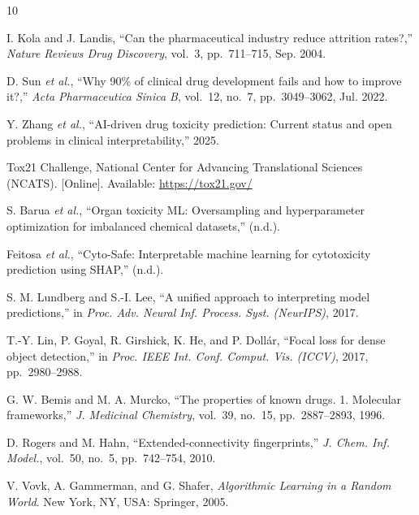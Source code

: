 \documentclass[lettersize,journal]{IEEEtran}
\begin{document}
  \begin{thebibliography}{10}
  

  I. Kola and J. Landis, ``Can the pharmaceutical industry reduce attrition
  rates?,'' \textit{Nature Reviews Drug Discovery}, vol.~3, pp.~711--715,
  Sep. 2004.

  D. Sun \textit{et al.}, ``Why 90\% of clinical drug development fails and
  how to improve it?,'' \textit{Acta Pharmaceutica Sinica B}, vol.~12, no.~7,
  pp.~3049--3062, Jul. 2022.

  Y. Zhang \textit{et al.}, ``AI-driven drug toxicity prediction: Current
  status and open problems in clinical interpretability,'' 2025.

  Tox21 Challenge, National Center for Advancing Translational Sciences
  (NCATS). [Online]. Available: \url{https://tox21.gov/}

  S. Barua \textit{et al.}, ``Organ toxicity ML: Oversampling and
  hyperparameter optimization for imbalanced chemical datasets,'' (n.d.).

  Feitosa \textit{et al.}, ``Cyto-Safe: Interpretable machine learning for
  cytotoxicity prediction using SHAP,'' (n.d.).

  S. M. Lundberg and S.-I. Lee, ``A unified approach to interpreting model
  predictions,'' in \textit{Proc. Adv. Neural Inf. Process. Syst. (NeurIPS)},
  2017.

  T.-Y. Lin, P. Goyal, R. Girshick, K. He, and P. Doll\'{a}r, ``Focal loss
  for dense object detection,'' in \textit{Proc. IEEE Int. Conf. Comput.
  Vis. (ICCV)}, 2017, pp.~2980--2988.

  G. W. Bemis and M. A. Murcko, ``The properties of known drugs. 1. Molecular
  frameworks,'' \textit{J. Medicinal Chemistry}, vol.~39, no.~15,
  pp.~2887--2893, 1996.

  D. Rogers and M. Hahn, ``Extended-connectivity fingerprints,''
  \textit{J. Chem. Inf. Model.}, vol.~50, no.~5, pp.~742--754, 2010.

  V. Vovk, A. Gammerman, and G. Shafer, \textit{Algorithmic Learning in a
  Random World}. New York, NY, USA: Springer, 2005.


\end{thebibliography}
\end{document}
